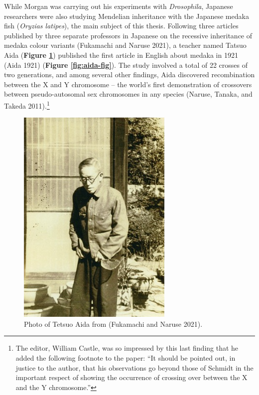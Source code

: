 \documentclass[
]{book}
\begin{document}
While Morgan was carrying out his experiments with \emph{Drosophila}, Japanese researchers were also studying Mendelian inheritance with the Japanese medaka fish (\emph{Oryzias latipes}), the main subject of this thesis. Following three articles published by three separate professors in Japanese on the recessive inheritance of medaka colour variants (Fukamachi and Naruse 2021), a teacher named Tatsuo Aida (\textbf{Figure \ref{fig:aida}}) published the first article in English about medaka in 1921 (Aida 1921) (\textbf{Figure \ref{fig:aida-fig}}). The study involved a total of 22 crosses of two generations, and among several other findings, Aida discovered recombination between the X and Y chromosome -- the world's first demonstration of crossovers between pseudo-autosomal sex chromosomes in any species (Naruse, Tanaka, and Takeda 2011).\footnote{The editor, William Castle, was so impressed by this last finding that he added the following footnote to the paper: ``It should be pointed out, in justice to the author, that his observations go beyond those of Schmidt in the important respect of showing the occurrence of crossing over between the X and the Y chromosome.''}



\begin{figure}

{\centering \includegraphics[width=0.8\linewidth]{figs/introduction/Aida} 

}

\caption{Photo of Tetsuo Aida from (Fukamachi and Naruse 2021).}\label{fig:aida}
\end{figure}
\end{document}
